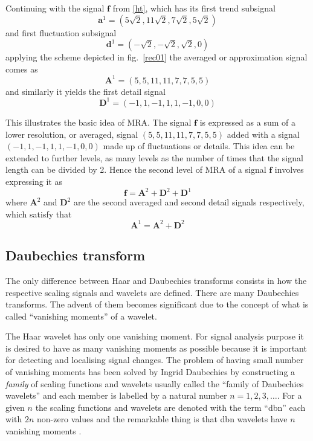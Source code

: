 \documentclass[a4paper,11pt]{report}
\begin{document}
Continuing with the signal $\mathbf{f}$ from \ref{ht}, which has its first trend subsignal 
\begin{displaymath}
\mathbf{a}^{1}=(5\sqrt{2},11\sqrt{2},7\sqrt{2},5\sqrt{2})
\end{displaymath}
and first fluctuation subsignal 
\begin{displaymath}
\mathbf{d}^{1}=(-\sqrt{2},-\sqrt{2},\sqrt{2},0)
\end{displaymath}
applying the scheme depicted in fig.~\ref{rec01} the averaged or approximation signal comes as
\begin{equation}
\mathbf{A}^{1} = (5,5,11,11,7,7,5,5)
\end{equation}
and similarly it yields the first detail signal
\begin{equation}
\mathbf{D}^{1} = (-1,1,-1,1,1,-1,0,0)
\end{equation}

This illustrates the basic idea of MRA. The signal $\mathbf{f}$ is expressed as a sum of a lower resolution, or averaged, signal $(5,5,11,11,7,7,5,5)$ added with a signal $(-1,1,-1,1,1,-1,0,0)$ made up of fluctuations or details. This idea can be extended to further levels, as many levels as the number of times that the signal length can be divided by 2. Hence the second level of MRA of a signal $\mathbf{f}$ involves expressing it as
\begin{equation}
\mathbf{f} = \mathbf{A}^{2} + \mathbf{D}^{2} + \mathbf{D}^{1}
\end{equation}
where $\mathbf{A}^{2}$ and $\mathbf{D}^{2}$ are the second averaged and second detail signals respectively, which satisfy that
\begin{equation}
\mathbf{A}^{1} = \mathbf{A}^{2} + \mathbf{D}^{2}
\end{equation}

\subsection{Daubechies transform} 
The only difference between Haar and Daubechies transforms consists in how the respective scaling signals and wavelets are defined. There are many Daubechies transforms. The advent of them becomes significant due to the concept of what is called ``vanishing moments'' of a wavelet.

The Haar wavelet has only one vanishing moment. For signal analysis purpose it is desired to have as many vanishing moments as possible because it is important for detecting and localising signal changes. The problem of having small number of vanishing moments has been solved by Ingrid Daubechies by constructing a \emph{family} of scaling functions and wavelets usually called the ``family of Daubechies wavelets'' and each member is labelled by a natural number $n=1,2,3,\ldots$. For a given $n$ the scaling functions and wavelets are denoted with the term ``dbn'' each with $2n$ non-zero values and the remarkable thing is that dbn wavelets have $n$ vanishing moments \cite{stark}.
\end{document}
